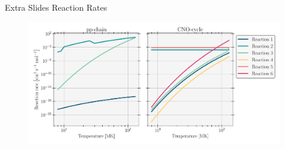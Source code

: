 \documentclass[10pt,xcolor=svgnames,table]{beamer} %
\begin{document}
\begin{frame}{Extra Slides}
\Large Reaction Rates
\begin{figure}
    \centering
    \includegraphics[width=1\textwidth]{figs/Reaction_Rates.pdf}
\end{figure}
\end{frame}
\end{document}
